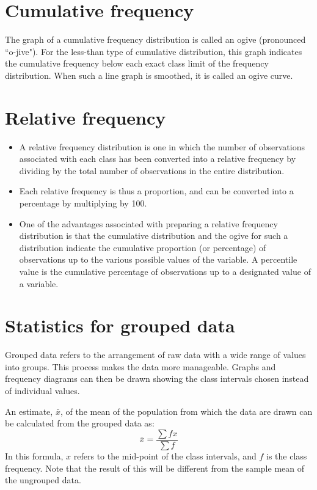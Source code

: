 \documentclass[]{report}
\begin{document}



	
\section{Cumulative frequency}
The graph of a cumulative frequency distribution is called an ogive (pronounced ``o-jive"). For the less-than
type of cumulative distribution, this graph indicates the cumulative frequency below each exact class limit of
the frequency distribution. When such a line graph is smoothed, it is called an ogive curve.


\section{Relative frequency}
\begin{itemize}
	\item A relative frequency distribution is one in which the number of observations associated with each class has
	been converted into a relative frequency by dividing by the total number of observations in the entire
	distribution. 
	\item Each relative frequency is thus a proportion, and can be converted into a percentage by multiplying
	by 100.\item One of the advantages associated with preparing a relative frequency distribution is that the cumulative
	distribution and the ogive for such a distribution indicate the cumulative proportion (or percentage) of
	observations up to the various possible values of the variable. A percentile value is the cumulative percentage of
	observations up to a designated value of a variable.
\end{itemize}



\section{Statistics for grouped data}
Grouped data refers to the arrangement of raw data with a wide range of values into groups. This process makes the data more manageable. Graphs and frequency diagrams can then be drawn showing the class intervals chosen instead of individual values.


\noindent An estimate, $\bar{x}$, of the mean of the population from which the data are drawn can be calculated from the grouped data as:
\[ \bar{x} = \frac{\sum f x }{\sum f}\]
In this formula, $x$ refers to the mid-point of the class intervals, and $f$ is the class frequency. Note that the result of this will be different from the sample mean of the ungrouped data.
\end{document}
